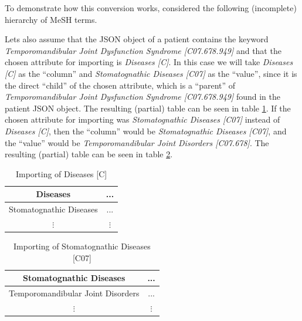 To demonstrate how this conversion works, considered the following (incomplete) hierarchy of MeSH terms.

Lets also assume that the JSON object of a patient contains the keyword \textit{Temporomandibular Joint Dysfunction Syndrome [C07.678.949]} and that the chosen attribute for importing is \textit{Diseases [C]}.
In this case we will take \textit{Diseases [C]} as the ``column'' and \textit{Stomatognathic Diseases [C07]} as the ``value'', since it is the direct ``child'' of the chosen attribute, which is a ``parent'' of \textit{Temporomandibular Joint Dysfunction Syndrome [C07.678.949]} found in the patient JSON object. The resulting (partial) table can be seen in table \ref{t:json-to-csv-1}.
If the chosen attribute for importing was \textit{Stomatognathic Diseases [C07]} instead of \textit{Diseases [C]}, then the ``column'' would be \textit{Stomatognathic Diseases [C07]}, and the ``value'' would be \textit{Temporomandibular Joint Disorders [C07.678]}. The resulting (partial) table can be seen in table \ref{t:json-to-csv-2}.

\begin{minipage}{0.45\textwidth}
  \begin{table}[H]
    \centering
    \caption{Importing of Diseases [C]}
    \label{t:json-to-csv-1}
  \begin{center}
    \begin{tabular}{ c | c}
     Diseases & ... \\
     \hline
     Stomatognathic Diseases & ... \\
     $\vdots$ & $\vdots$ \\
    \end{tabular}
  \end{center}
\end{table}
\end{minipage}
\begin{minipage}{0.45\textwidth}
  \begin{table}[H]
    \centering
    \caption{Importing of Stomatognathic Diseases [C07]}
    \label{t:json-to-csv-2}
  \begin{center}
    \begin{tabular}{ c | c}
     Stomatognathic Diseases & ... \\
     \hline
     Temporomandibular Joint Disorders & ... \\
     $\vdots$ & $\vdots$ \\
    \end{tabular}
  \end{center}
\end{table}
\end{minipage}


